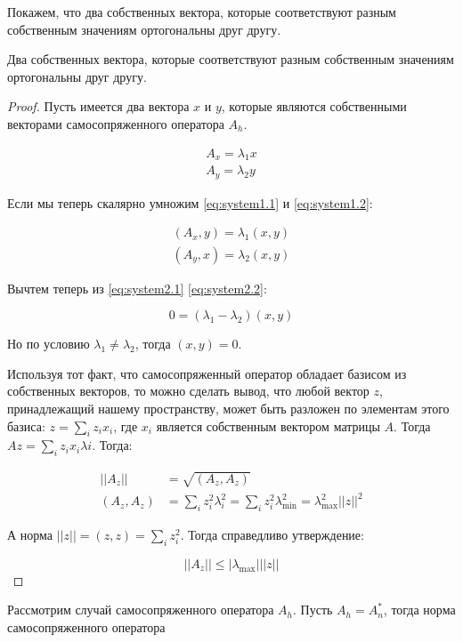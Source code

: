 Покажем, что два собственных вектора, которые соответствуют разным собственным значениям ортогональны друг другу.

\begin{theorem}
	Два собственных вектора, которые соответствуют разным собственным значениям ортогональны друг другу.
\end{theorem}

\begin{proof}
	Пусть имеется два вектора $x$ и $y$, которые являются собственными векторами самосопряженного оператора $A_h$. 
	
	\begin{align}
		A_x = \lambda_1 x \label{eq:system1.1}\\
		A_y = \lambda_2 y \label{eq:system1.2}
	\end{align}
	
	Если мы теперь скалярно умножим \eqref{eq:system1.1} и \eqref{eq:system1.2}:
	
	\begin{align}
		(A_x,y) = \lambda_1 (x, y) \label{eq:system2.1}\\
		(A_y,x) = \lambda_2 (x, y) \label{eq:system2.2}
	\end{align}
	
	Вычтем теперь из \eqref{eq:system2.1} \eqref{eq:system2.2}:
	
	\begin{equation}
		\label{eq:diff-system}
		0 = (\lambda_1 - \lambda_2)(x, y)
	\end{equation}
	
	Но по условию $\lambda_1 \neq \lambda_2$, тогда $(x, y) = 0$.
	
	Используя тот факт, что самосопряженный оператор обладает базисом из собственных векторов, то можно сделать вывод, что любой вектор $z$, принадлежащий нашему пространству, может быть разложен по элементам этого базиса: $z = \sum\limits_i z_i x_i$, где $x_i$ является собственным вектором матрицы $A$. Тогда $Az = \sum\limits_i z_i x_i \lambda i$. Тогда:
	
	\begin{align}
		||A_z|| & = \sqrt{(A_z, A_z)} \label{eq:norm-az}\\
		(A_z, A_z) & = \sum\limits_i z_i^2 \lambda_i^2 = \sum\limits_i z_i^2\lambda_{\min}^2 = \lambda_{\max}^2 ||z||^2 \label{eq:scalar-mul-1}
	\end{align}
	
	А норма $||z|| = (z, z) = \sum\limits_i z_i^2$. Тогда справедливо утверждение:
	
	\begin{equation}
		\label{eq:norm-az-leq}
		||A_z|| \leq |\lambda_{\max}| ||z||
	\end{equation}
	
	
	

	
\end{proof}

Рассмотрим случай самосопряженного оператора $A_h$. Пусть $A_h = A^{*}_n$, тогда норма самосопряженного оператора 